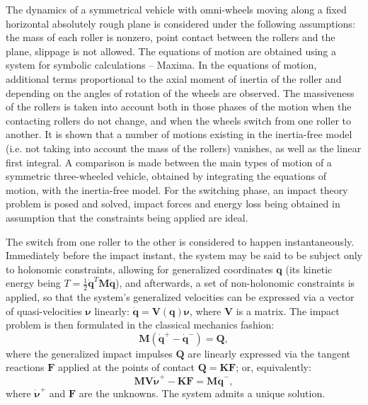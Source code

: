 \documentclass[letterpaper,11pt]{article}
\begin{document}
The dynamics of a symmetrical vehicle with omni-wheels moving along a fixed horizontal absolutely rough plane is considered under the following assumptions: the mass of each roller is nonzero, point contact between the rollers and the plane, slippage is not allowed. The equations of motion are obtained using a system for symbolic calculations -- Maxima. In the equations of motion, additional terms proportional to the axial moment of inertia of the roller and depending on the angles of rotation of the wheels are observed. The massiveness of the rollers is taken into account both in those phases of the motion when the contacting rollers do not change, and when the wheels switch from one roller to another. It is shown that a number of motions existing in the inertia-free model (i.e. not taking into account the mass of the rollers) vanishes, as well as the linear first integral. A comparison is made between the main types of motion of a symmetric three-wheeled vehicle, obtained by integrating the equations of motion, with the inertia-free model. For the switching phase, an impact theory problem is posed and solved, impact forces and energy loss being obtained in assumption that the constraints being applied are ideal.

The switch from one roller to the other is considered to happen instantaneously. Immediately before the impact instant, the system may be said to be subject only to holonomic constraints, allowing for generalized coordinates $\mathbf{q}$ (its kinetic energy being $T = \frac{1}{2}\dot{\mathbf{q}}^T\mathbf{M}\dot{\mathbf{q}}$), and afterwards, a set of non-holonomic constraints is applied, so that the system's generalized velocities can be expressed via a vector of quasi-velocities $\mathbf{\nu}$ linearly: $\dot{\mathbf{q}} = \mathbf{V}(\mathbf{q})\mathbf{\nu}$, where $\mathbf{V}$ is a matrix. The impact problem is then formulated in the classical mechanics fashion:
\begin{equation}
\mathbf{M} (\dot{\mathbf{q}}^+ - \dot{\mathbf{q}}^-) = \mathbf{Q},
\label{eq:equation}
\end{equation}
where the generalized impact impulses $\mathbf{Q}$ are linearly expressed via the tangent reactions $\mathbf{F}$ applied at the points of contact $\mathbf{Q} = \mathbf{K}\mathbf{F}$; or, equivalently:
\begin{equation}
\mathbf{M}\mathbf{V}\dot{\mathbf{\nu}}^+ - \mathbf{K}\mathbf{F} = \mathbf{M}\dot{\mathbf{q}}^-,
\label{eq:equation}
\end{equation}
where $\dot{\mathbf{\nu}}^+$ and $\mathbf{F}$ are the unknowns. The system admits a unique solution.
\end{document}
